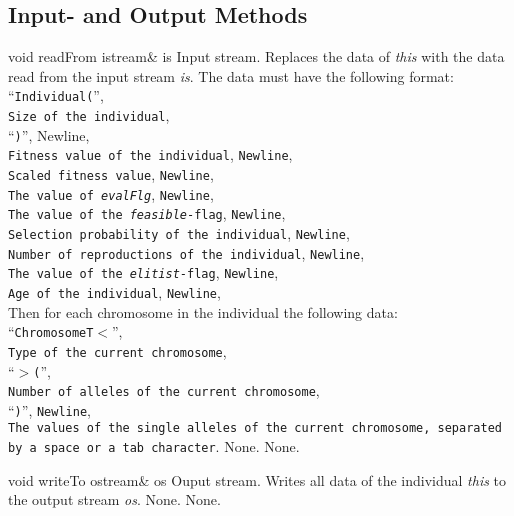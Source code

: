\subsection{Input- and Output Methods}

\setNormalInstance
\printMethodWithOneParam
{void}
{readFrom}
{istream\&}
{is}
{Input stream.}
{Replaces the data of {\em this} with the data read from the
 input stream {\em is}. The data must have the following format:\\
    ``{\tt Individual(}'',\\
    {\tt Size of the individual},\\ 
    ``{\tt )}'', Newline,\\ 
    {\tt Fitness value of the individual}, {\tt Newline},\\
    {\tt Scaled fitness value}, {\tt Newline},\\
    {\tt The value of {\em evalFlg}}, {\tt Newline},\\
    {\tt The value of the {\em feasible}-flag}, {\tt Newline},\\
    {\tt Selection probability of the individual}, {\tt Newline},\\
    {\tt Number of reproductions of the individual}, {\tt Newline},\\
    {\tt The value of the {\em elitist}-flag}, {\tt Newline},\\
    {\tt Age of the individual}, {\tt Newline},\\
    Then for each chromosome in the individual the following data:\\    
    ``{\tt ChromosomeT$<$}'',\\
    {\tt Type of the current chromosome},\\ 
    ``{\tt $>$(}'',\\ 
    {\tt Number of alleles of the current chromosome},\\
    ``{\tt )}'', {\tt Newline},\\
    {\tt The values of the single alleles of the current chromosome, separated by
    a space or a tab character}.}
{None.}
{None.}

\vspace*{4ex}

\setConstInstance
\printMethodWithOneParam
{void}
{writeTo}
{ostream\&}
{os}
{Ouput stream.}
{Writes all data of the individual {\em this} to the
 output stream {\em os}.}
{None.}
{None.}
